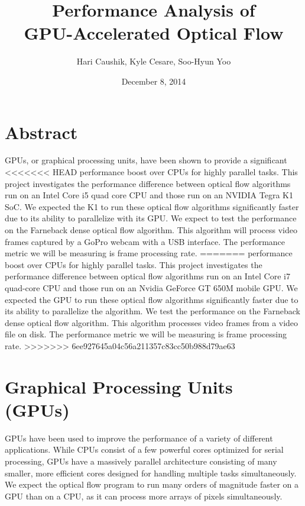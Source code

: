 \documentclass[12pt,letterpaper]{article}
\title{Performance Analysis of \\ GPU-Accelerated Optical Flow}
\date{December 8, 2014}
\author{Hari Caushik, Kyle Cesare, Soo-Hyun Yoo}
\begin{document}
\maketitle
\thispagestyle{empty}
\newpage

\tableofcontents
\newpage

\section{Abstract}
GPUs, or graphical processing units, have been shown to provide a significant
<<<<<<< HEAD
performance boost over CPUs for highly parallel tasks\cite{gpupipeline}. This
project investigates the performance difference between optical flow algorithms
run on an Intel Core i5 quad core CPU and those run on an NVIDIA Tegra K1 SoC.
We expected the K1 to run these optical flow algorithms significantly faster due
to its ability to parallelize with its GPU. We expect to test the performance
on the Farneback dense optical flow algorithm. This algorithm will process
video frames captured by a GoPro webcam with a USB interface. The performance
metric we will be measuring is frame processing rate.
=======
performance boost over CPUs for highly parallel tasks. This project
investigates the performance difference between optical flow algorithms run on
an Intel Core i7 quad-core CPU and those run on an Nvidia GeForce GT 650M
mobile GPU. We expected the GPU to run these optical flow algorithms
significantly faster due to its ability to parallelize the algorithm. We test
the performance on the Farneback dense optical flow algorithm. This algorithm
processes video frames from a video file on disk. The performance metric we
will be measuring is frame processing rate.
>>>>>>> 6ee927645a04c56a211357c83cc50b988d79ae63

\section{Graphical Processing Units (GPUs)}
GPUs have been used to improve the performance of a variety of different
applications. While CPUs consist of a few powerful cores optimized for serial
processing, GPUs have a massively parallel architecture consisting of many
smaller, more efficient cores designed for handling multiple tasks
simultaneously\cite{gpuoverview}. We expect the optical flow program to run many
orders of magnitude faster on a GPU than on a CPU, as it can process more arrays
of pixels simultaneously.
\end{document}
